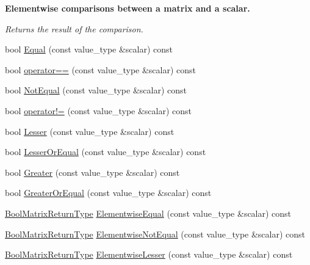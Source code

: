\begin{Indent}{\bf Elementwise comparisons between a matrix and a scalar.}\par
{\em Returns the result of the comparison. }\begin{DoxyCompactItemize}
\item 
bool \hyperlink{classvct_dynamic_const_matrix_base_a0ea11bd3f6b9acfc8cca4fe258f64775}{Equal} (const value\+\_\+type \&scalar) const 
\item 
bool \hyperlink{classvct_dynamic_const_matrix_base_a6d8f173aff05e29546051d581b2b1c80}{operator==} (const value\+\_\+type \&scalar) const 
\item 
bool \hyperlink{classvct_dynamic_const_matrix_base_a8c6946705498c804915af7c7e976601c}{Not\+Equal} (const value\+\_\+type \&scalar) const 
\item 
bool \hyperlink{classvct_dynamic_const_matrix_base_a82165bf37eeaded8c79e2342c4423e8e}{operator!=} (const value\+\_\+type \&scalar) const 
\item 
bool \hyperlink{classvct_dynamic_const_matrix_base_af185172c44ddcd88ca122bb4dff87f6e}{Lesser} (const value\+\_\+type \&scalar) const 
\item 
bool \hyperlink{classvct_dynamic_const_matrix_base_a4cd753140d62da0dc24632c5cea5c17e}{Lesser\+Or\+Equal} (const value\+\_\+type \&scalar) const 
\item 
bool \hyperlink{classvct_dynamic_const_matrix_base_ae7f3ff39f81672610a66d153ee3a3e34}{Greater} (const value\+\_\+type \&scalar) const 
\item 
bool \hyperlink{classvct_dynamic_const_matrix_base_a0c1a858c74218da042fe24fec7e6596c}{Greater\+Or\+Equal} (const value\+\_\+type \&scalar) const 
\item 
\hyperlink{classvct_dynamic_const_matrix_base_ac71d88dda7abaaeb2276b83f2e49def7}{Bool\+Matrix\+Return\+Type} \hyperlink{classvct_dynamic_const_matrix_base_a3b17221784161d1778334a56b31fa8a8}{Elementwise\+Equal} (const value\+\_\+type \&scalar) const 
\item 
\hyperlink{classvct_dynamic_const_matrix_base_ac71d88dda7abaaeb2276b83f2e49def7}{Bool\+Matrix\+Return\+Type} \hyperlink{classvct_dynamic_const_matrix_base_a645b23e25d28049e92e4d192e19e42e7}{Elementwise\+Not\+Equal} (const value\+\_\+type \&scalar) const 
\item 
\hyperlink{classvct_dynamic_const_matrix_base_ac71d88dda7abaaeb2276b83f2e49def7}{Bool\+Matrix\+Return\+Type} \hyperlink{classvct_dynamic_const_matrix_base_a515d379cc1fa0088de2ea36f9b5c0f86}{Elementwise\+Lesser} (const value\+\_\+type \&scalar) const 

\end{DoxyCompactItemize}
\end{Indent}
